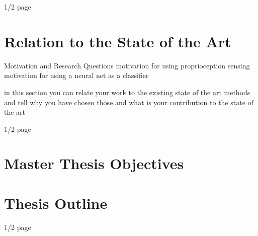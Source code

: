 1/2 page

\section{Relation to the State of the Art}
Motivation and Research Questions
motivation for using proprioception sensing
motivation for using a neural net as a classifier

in this section you can relate your work to the existing state of the art methods and tell why you have chosen those and what is your contribution to the state of the art

1/2 page

\newpage
\section{Master Thesis Objectives} \label{sec:goals}

\section{Thesis Outline}

1/2 page

